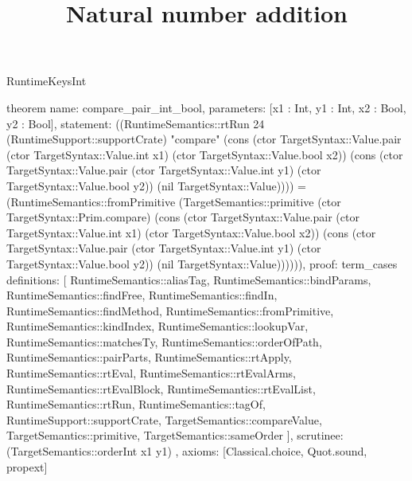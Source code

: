 \begin{lexlean}{RuntimeKeysInt}
\title{Natural number addition}
\begin{semanticmodule}
theorem{
  name: compare_pair_int_bool,
  parameters: [x1 : Int, y1 : Int, x2 : Bool, y2 : Bool],
  statement: ((RuntimeSemantics::rtRun 24 (RuntimeSupport::supportCrate) "compare" (cons (ctor TargetSyntax::Value.pair (ctor TargetSyntax::Value.int x1) (ctor TargetSyntax::Value.bool x2)) (cons (ctor TargetSyntax::Value.pair (ctor TargetSyntax::Value.int y1) (ctor TargetSyntax::Value.bool y2)) (nil TargetSyntax::Value)))) = (RuntimeSemantics::fromPrimitive (TargetSemantics::primitive (ctor TargetSyntax::Prim.compare) (cons (ctor TargetSyntax::Value.pair (ctor TargetSyntax::Value.int x1) (ctor TargetSyntax::Value.bool x2)) (cons (ctor TargetSyntax::Value.pair (ctor TargetSyntax::Value.int y1) (ctor TargetSyntax::Value.bool y2)) (nil TargetSyntax::Value)))))),
  proof: term_cases{
    definitions: [
      RuntimeSemantics::aliasTag,
      RuntimeSemantics::bindParams,
      RuntimeSemantics::findFree,
      RuntimeSemantics::findIn,
      RuntimeSemantics::findMethod,
      RuntimeSemantics::fromPrimitive,
      RuntimeSemantics::kindIndex,
      RuntimeSemantics::lookupVar,
      RuntimeSemantics::matchesTy,
      RuntimeSemantics::orderOfPath,
      RuntimeSemantics::pairParts,
      RuntimeSemantics::rtApply,
      RuntimeSemantics::rtEval,
      RuntimeSemantics::rtEvalArms,
      RuntimeSemantics::rtEvalBlock,
      RuntimeSemantics::rtEvalList,
      RuntimeSemantics::rtRun,
      RuntimeSemantics::tagOf,
      RuntimeSupport::supportCrate,
      TargetSemantics::compareValue,
      TargetSemantics::primitive,
      TargetSemantics::sameOrder
    ],
    scrutinee: (TargetSemantics::orderInt x1 y1)
  },
  axioms: [Classical.choice, Quot.sound, propext]
}


\end{semanticmodule}
\end{lexlean}
